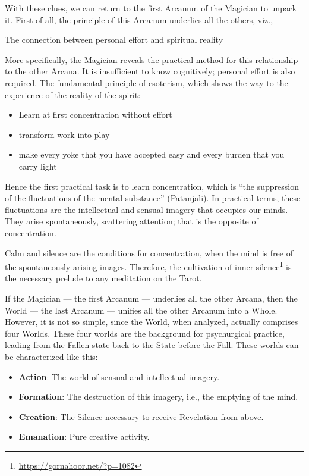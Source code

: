 With these clues, we can return to the first Arcanum of the Magician to unpack it. First of all, the principle of this Arcanum underlies all the others, viz.,

\begin{quotex}
The connection between personal effort and spiritual reality
\end{quotex}


More specifically, the Magician reveals the practical method for this relationship to the other Arcana. It is insufficient to know cognitively; personal effort is also required. The fundamental principle of esoterism, which shows the way to the experience of the reality of the spirit:

\begin{itemize}


\item Learn at first concentration without effort

\item transform work into play

\item make every yoke that you have accepted easy and every burden that you carry light
\end{itemize}


Hence the first practical task is to learn concentration, which is ``the suppression of the fluctuations of the mental substance'' (Patanjali). In practical terms, these fluctuations are the intellectual and sensual imagery that occupies our minds. They arise spontaneously, scattering attention; that is the opposite of concentration.

Calm and silence are the conditions for concentration, when the mind is free of the spontaneously arising images. Therefore, the cultivation of inner silence\footnote{\url{https://gornahoor.net/?p=1082}} is the necessary prelude to any meditation on the Tarot.

If the Magician --- the first Arcanum --- underlies all the other Arcana, then the World --- the last Arcanum --- unifies all the other Arcanum into a Whole. However, it is not so simple, since the World, when analyzed, actually comprises four Worlds. These four worlds are the background for psychurgical practice, leading from the Fallen state back to the State before the Fall. These worlds can be characterized like this:

\begin{itemize}


\item \textbf{Action}: The world of sensual and intellectual imagery.


\item \textbf{Formation}: The destruction of this imagery, i.e., the emptying of the mind.

\item \textbf{Creation}: The Silence necessary to receive Revelation from above.

\item \textbf{Emanation}: Pure creative activity.

\end{itemize}


